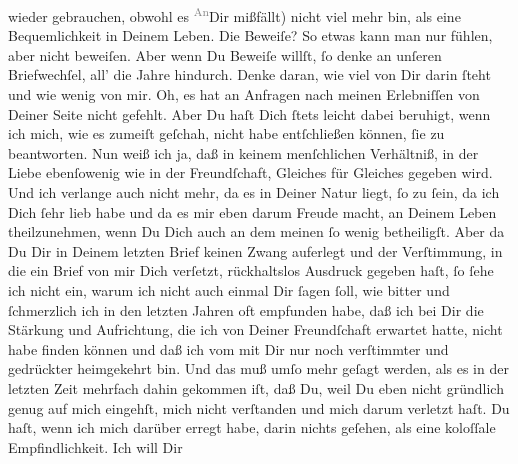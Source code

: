 \begin{ledgroupsized}[t]{13cm}
               wieder gebrauchen,  obwohl es \substVorne{}\textsuperscript{\textcolor{gray}{An}}\substDazwischen{}Dir\substHinten{} mißfällt) nicht viel mehr bin, als eine Bequemlichkeit in Deinem
               Leben. Die Beweiſe? So etwas kann man nur fühlen, aber nicht beweiſen. Aber wenn Du
               Beweiſe willſt, ſo denke an unſeren Briefwechſel, all’ die Jahre hindurch. Denke {\pb}daran, wie viel von Dir darin ſteht und wie wenig
               von mir. Oh, es hat an Anfragen nach meinen Erlebniſſen von Deiner Seite nicht
               gefehlt. Aber Du haſt Dich ſtets leicht dabei beruhigt, wenn ich mich, wie es zumeiſt
               geſchah, nicht habe entſchließen können, ſie zu beantworten. Nun weiß ich ja, daß in
               keinem menſchlichen Verhältniß, in der Liebe ebenſowenig wie in der Freundſchaft,
               Gleiches für Gleiches gegeben wird. Und ich verlange auch nicht mehr, da es in Deiner
               Natur liegt, ſo zu ſein, da ich Dich ſehr lieb habe und da es mir eben darum Freude
               macht, an Deinem Leben theilzunehmen, wenn Du Dich auch an dem meinen ſo wenig
               betheiligſt. Aber da Du Dir in Deinem letzten Brief keinen Zwang auferlegt und der
               Verſtimmung, in die ein Brief von mir Dich verſetzt, rückhaltslos Ausdruck gegeben
               haſt, ſo ſehe ich nicht ein, warum ich nicht auch einmal Dir ſagen ſoll, wie bitter
               und ſchmerzlich \strikeout{\textcolor{gray}{h}} ich in den letzten Jahren oft  empfunden
               habe, daß {\pb}ich bei Dir die Stärkung und Aufrichtung,
               die ich von Deiner Freundſchaft erwartet hatte, nicht habe finden können und daß ich
               vom \label{K_L03194-2v}\label{K_L03194-2h} mit Dir nur noch verſtimmter und gedrückter heimgekehrt bin. Und das muß umſo
               mehr geſagt werden, als es in der letzten Zeit mehrfach dahin gekommen iſt, daß Du,
               weil Du eben nicht gründlich genug auf mich eingehſt, mich \strikeout{\textcolor{gray}{×}\-\textcolor{gray}{×}} nicht verſtanden und mich darum verletzt haſt. Du haſt, wenn ich mich darüber
               erregt habe, darin nichts geſehen, als eine koloſſale Empfindlichkeit. Ich will Dir

\end{ledgroupsized}
